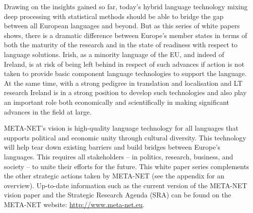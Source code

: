 \begin{multicols}{2}

Drawing on the insights gained so far, today’s hybrid language technology mixing deep processing with statistical methods should be able to bridge the gap between all European languages and beyond. But as this series of white papers shows, there is a dramatic difference between Europe's member states in terms of both the maturity of the research and in the state of readiness with respect to language solutions. Irish, as a minority language of the EU, and indeed of Ireland, is at risk of being left behind in respect of such advances if action is not taken to provide basic component language technologies to support the language. At the same time, with a strong pedigree in translation and localisation and LT research Ireland is in a strong position to develop such technologies and also play an important role both economically and scientifically in making significant advances in the field at large.

META-NET's vision is high-quality language technology for all languages that supports political and economic unity through cultural diversity. This technology will help tear down existing barriers and build bridges between Europe's languages. This requires all stakeholders -- in politics, research, business, and society -- to unite their efforts for the future.
This white paper series complements the other strategic actions taken by META-NET (see the appendix for an overview). Up-to-date information such as the current version of the META-NET vision paper \cite{Meta1} and the Strategic Research Agenda (SRA) can be found on the META-NET website: \url{http://www.meta-net.eu}.
\end{multicols}

\clearpage


